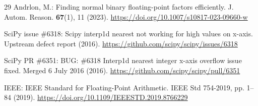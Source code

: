 \documentclass[11pt,a4paper]{article}
\begin{document}
\begin{thebibliography}{29}
Andrlon, M.: Finding normal binary floating-point factors efficiently. J. Autom. Reason. \textbf{67}(1), 11 (2023). \url{https://doi.org/10.1007/s10817-023-09660-w}

SciPy issue \#6318: Scipy interp1d nearest not working for high values on x-axis. Upstream defect report (2016). \url{https://github.com/scipy/scipy/issues/6318}

SciPy PR \#6351: BUG: \#6318 Interp1d nearest integer x-axis overflow issue fixed. Merged 6 July 2016 (2016). \url{https://github.com/scipy/scipy/pull/6351}

IEEE: IEEE Standard for Floating-Point Arithmetic. IEEE Std 754-2019, pp. 1--84 (2019). \url{https://doi.org/10.1109/IEEESTD.2019.8766229}
\end{thebibliography}
\end{document}
